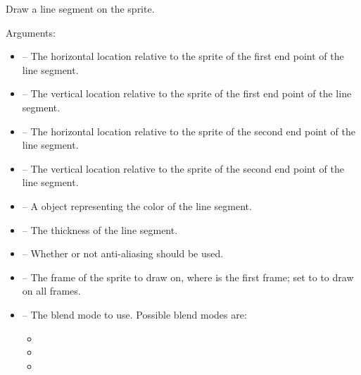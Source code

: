 \documentclass[letterpaper,10pt,english]{sphinxmanual}
\begin{document}

\begin{fulllineitems}
\label{gfx:sge.gfx.Sprite.draw_line}
Draw a line segment on the sprite.

Arguments:
\begin{itemize}
\item {} 
 -- The horizontal location relative to the sprite of
the first end point of the line segment.

\item {} 
 -- The vertical location relative to the sprite of the
first end point of the line segment.

\item {} 
 -- The horizontal location relative to the sprite of
the second end point of the line segment.

\item {} 
 -- The vertical location relative to the sprite of the
second end point of the line segment.

\item {} 
 -- A {\hyperref[gfx:sge.gfx.Color]{\emph{}}} object representing the
color of the line segment.

\item {} 
 -- The thickness of the line segment.

\item {} 
 -- Whether or not anti-aliasing should be used.

\item {} 
 -- The frame of the sprite to draw on, where 
is the first frame; set to  to draw on all
frames.

\item {} 
 -- The blend mode to use.  Possible blend modes
are:
\begin{itemize}
\item {} 

\item {} 

\item {} 


\end{itemize}
\end{itemize}
\end{fulllineitems}
\end{document}
